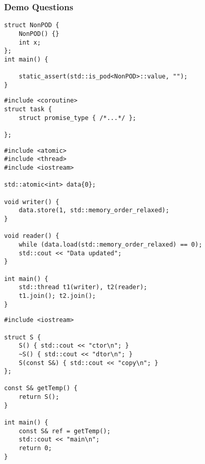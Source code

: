 \subsubsection{Demo Questions}

\begin{tcolorbox}[left=0mm,right=0mm,top=0mm,bottom=0mm,boxsep=1mm,arc=0mm,boxrule=0pt, frame empty, breakable]
    \small
    \begin{lstlisting}
struct NonPOD {
    NonPOD() {}
    int x;
};
int main() {

    static_assert(std::is_pod<NonPOD>::value, "");
}
\end{lstlisting}
\end{tcolorbox}



\begin{tcolorbox}[left=0mm,right=0mm,top=0mm,bottom=0mm,boxsep=1mm,arc=0mm,boxrule=0pt, frame empty, breakable]
    \small
    \begin{lstlisting}
#include <coroutine>
struct task {
    struct promise_type { /*...*/ };

};
\end{lstlisting}
\end{tcolorbox}

\begin{tcolorbox}[left=0mm,right=0mm,top=0mm,bottom=0mm,boxsep=1mm,arc=0mm,boxrule=0pt, frame empty, breakable]
    \small
    \begin{lstlisting}
#include <atomic>
#include <thread>
#include <iostream>

std::atomic<int> data{0};

void writer() {
    data.store(1, std::memory_order_relaxed);
}

void reader() {
    while (data.load(std::memory_order_relaxed) == 0);
    std::cout << "Data updated";
}

int main() {
    std::thread t1(writer), t2(reader);
    t1.join(); t2.join();
}
\end{lstlisting}
\end{tcolorbox}


\begin{tcolorbox}[left=0mm,right=0mm,top=0mm,bottom=0mm,boxsep=1mm,arc=0mm,boxrule=0pt, frame empty, breakable]
    \small
    \begin{lstlisting}
#include <iostream>

struct S {
    S() { std::cout << "ctor\n"; }
    ~S() { std::cout << "dtor\n"; }
    S(const S&) { std::cout << "copy\n"; }
};

const S& getTemp() {
    return S();
}

int main() {
    const S& ref = getTemp();
    std::cout << "main\n";
    return 0;
}
\end{lstlisting}
\end{tcolorbox}



